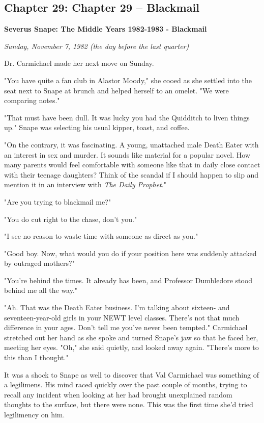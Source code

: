 \documentclass[a4paper,11pt]{article}
\begin{document}
\subsection{Chapter 29: Chapter 29 – Blackmail}

\textbf{Severus Snape: The Middle Years 1982-1983 - Blackmail}

\emph{Sunday, November 7, 1982 (the day before the last quarter)}

Dr. Carmichael made her next move on Sunday.

"You have quite a fan club in Alastor Moody," she cooed as she settled into the seat next to Snape at brunch and helped herself to an omelet. "We were comparing notes."

"That must have been dull. It was lucky you had the Quidditch to liven things up." Snape was selecting his usual kipper, toast, and coffee.

"On the contrary, it was fascinating. A young, unattached male Death Eater with an interest in sex and murder. It sounds like material for a popular novel. How many parents would feel comfortable with someone like that in daily close contact with their teenage daughters? Think of the scandal if I should happen to slip and mention it in an interview with \emph{The Daily Prophet}."

"Are you trying to blackmail me?"

"You do cut right to the chase, don't you."

"I see no reason to waste time with someone as direct as you."

"Good boy. Now, what would you do if your position here was suddenly attacked by outraged mothers?"

"You're behind the times. It already has been, and Professor Dumbledore stood behind me all the way."

"Ah. That was the Death Eater business. I'm talking about sixteen- and seventeen-year-old girls in your NEWT level classes. There's not that much difference in your ages. Don't tell me you've never been tempted." Carmichael stretched out her hand as she spoke and turned Snape's jaw so that he faced her, meeting her eyes. "Oh," she said quietly, and looked away again. "There's more to this than I thought."

It was a shock to Snape as well to discover that Val Carmichael was something of a legilimens. His mind raced quickly over the past couple of months, trying to recall any incident when looking at her had brought unexplained random thoughts to the surface, but there were none. This was the first time she'd tried legilimency on him.
\end{document}
